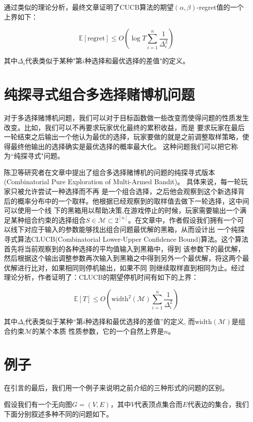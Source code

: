 \documentclass[bachelor]{thuthesis}
\begin{document}
通过类似的理论分析，最终文章\cite{cmab}证明了CUCB算法的期望$(\alpha,\beta)$-regret值的一个上界如下：

\[\mathbb{E}[\text{regret}]\le O\left(\log T\sum_{i=1}^{n}\frac{1}{\Delta_i^2}\right)\]

其中$\Delta_i$代表类似于某种"第$i$种选择和最优选择的差值"的定义。

\section{纯探寻式组合多选择赌博机问题}

对于多选择赌博机问题，我们可以对于目标函数做一些改变而使得问题的性质发生改变。比如，我们可以不再要求玩家优化最终的累积收益，而是
要求玩家在最后一轮结束之后输出一个他认为最优的选择，玩家要做的就是之前调整取样策略，使得最终他输出的选择确实是最优选择的概率最大化。
这种问题我们可以把它称为``纯探寻式"问题。

陈卫等研究者在文章\cite{cpemab}中提出了组合多选择赌博机的问题的纯探寻式版本(Combinatorial Pure Exploration of Multi-Armed Bandit)。
具体来说，每一轮玩家只被允许尝试一种选择而不再
是一个组合选择，之后他会观察到这个新选择背后的概率分布中的一个取样。他根据已经观察到的取样值去做下一轮选择，这中间可以使用一个线
下的黑箱用以帮助决策,在游戏停止的时候，玩家需要输出一个满足某种组合约束的选择组合$S\in\mathcal{M}\subset2^{[n]}$。在文章\cite{cpemab}中，作者假设我们拥有一个可以线下对应于输入的参数能够找出组合问题最优解的黑箱，从而设计出
一个纯探寻式算法CLUCB(Combinatorial Lower-Upper Confidence Bound)算法。这个算法首先将当前观察到的各种选择的平均值输入到黑箱中，得到
该参数下的最优解，然后根据这个输出调整参数再次输入到黑箱之中得到另外一个最优解，将这两个最优解进行比对，如果相同则停机输出，如果不同
则继续取样直到相同为止。经过理论分析，作者证明了：CLUCB的期望停机时间有如下的上界：

\[\mathbb{E}[T]\le O\left(\text{width}^2(\mathcal{M})\sum_{i=1}^{n}\frac{1}{\Delta_i^2}\right)\]

其中$\Delta_i$代表类似于某种“第$i$种选择和最优选择的差值”的定义, 而$\text{width}(\mathcal{M})$是组合约束$\mathcal{M}$的某个本质
性质参数，它的一个自然上界是$n$。

\section{例子}

在引言的最后，我们用一个例子来说明之前介绍的三种形式的问题的区别。

假设我们有一个无向图$G=(V,E)$，其中$V$代表顶点集合而$E$代表边的集合，我们下面分别叙述多种不同的问题如下。
\end{document}
